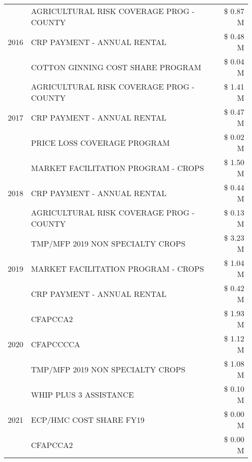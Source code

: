 \begin{tabular}{llr}
\multirow[t]{3}{*}{2016} & AGRICULTURAL RISK COVERAGE PROG - COUNTY & \$ 0.87 M \\
 & CRP PAYMENT - ANNUAL RENTAL & \$ 0.48 M \\
 & COTTON GINNING COST SHARE PROGRAM & \$ 0.04 M \\
\cline{1-3}
\multirow[t]{3}{*}{2017} & AGRICULTURAL RISK COVERAGE PROG - COUNTY & \$ 1.41 M \\
 & CRP PAYMENT - ANNUAL RENTAL & \$ 0.47 M \\
 & PRICE LOSS COVERAGE PROGRAM & \$ 0.02 M \\
\cline{1-3}
\multirow[t]{3}{*}{2018} & MARKET FACILITATION PROGRAM - CROPS & \$ 1.50 M \\
 & CRP PAYMENT - ANNUAL RENTAL & \$ 0.44 M \\
 & AGRICULTURAL RISK COVERAGE PROG - COUNTY & \$ 0.13 M \\
\cline{1-3}
\multirow[t]{3}{*}{2019} & TMP/MFP 2019 NON SPECIALTY CROPS & \$ 3.23 M \\
 & MARKET FACILITATION PROGRAM - CROPS & \$ 1.04 M \\
 & CRP PAYMENT - ANNUAL RENTAL & \$ 0.42 M \\
\cline{1-3}
\multirow[t]{3}{*}{2020} & CFAPCCA2 & \$ 1.93 M \\
 & CFAPCCCCA & \$ 1.12 M \\
 & TMP/MFP 2019 NON SPECIALTY CROPS & \$ 1.08 M \\
\cline{1-3}
\multirow[t]{3}{*}{2021} & WHIP PLUS 3 ASSISTANCE & \$ 0.10 M \\
 & ECP/HMC COST SHARE FY19 & \$ 0.00 M \\
 & CFAPCCA2 & \$ 0.00 M \\
\cline{1-3}
\bottomrule
\end{tabular}
